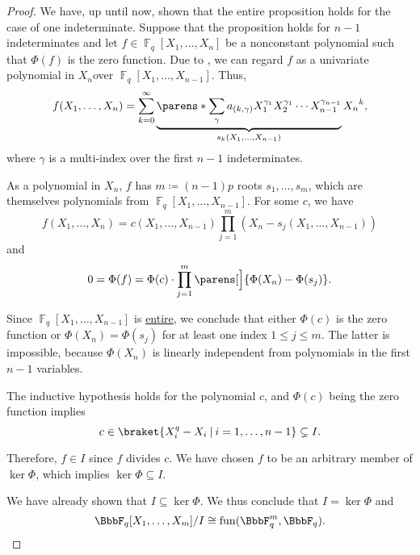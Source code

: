 \begin{proof}
  We have, up until now, shown that the entire proposition holds for the case of one indeterminate. Suppose that the proposition holds for \( n - 1 \) indeterminates and let \( f \in \BbbF_q[X_1, \ldots, X_n] \) be a nonconstant polynomial such that \( \Phi(f) \) is the zero function. Due to , we can regard \( f \) as a univariate polynomial in \( X_n \)over \( \BbbF_q[X_1, \ldots, X_{n-1}] \). Thus,
  \begin{equation*}
    f(X_1, \ldots, X_n) = \sum_{k =0}^\infty \underbrace{\parens*{ \sum_\gamma a_{(k,\gamma)} X_1^{\gamma_1} X_2^{\gamma_1} \cdots X_{n-1}^{\gamma_{n-1}} }}_{s_k(X_1, \ldots, X_{n-1})} {X_n}^k,
  \end{equation*}
  where \( \gamma \) is a multi-index over the first \( n - 1 \) indeterminates.

  As a polynomial in \( X_n \), \( f \) has \( m \coloneqq (n-1)p \) roots \( s_1, \ldots, s_m \), which are themselves polynomials from \( \BbbF_q[X_1, \ldots, X_{n-1}] \). For some \( c \), we have
  \begin{equation*}
    f(X_1, \ldots, X_n) = c(X_1, \ldots, X_{n-1}) \prod_{j=1}^m (X_n - s_j(X_1, \ldots, X_{n-1}))
  \end{equation*}
  and
  \begin{equation*}
    0 = \Phi(f) = \Phi(c) \cdot \prod_{j=1}^m \parens[\Big]{ \Phi(X_n) - \Phi(s_j) }.
  \end{equation*}

  Since \( \BbbF_q[X_1, \ldots, X_{n-1}] \) is \hyperref[def:entire_semiring]{entire}, we conclude that either \( \Phi(c) \) is the zero function or \( \Phi(X_n) = \Phi(s_j) \) for at least one index \( 1 \leq j \leq m \). The latter is impossible, because \( \Phi(X_n) \) is linearly independent from polynomials in the first \( n - 1 \) variables.

  The inductive hypothesis holds for the polynomial \( c \), and \( \Phi(c) \) being the zero function implies
  \begin{equation*}
    c \in \braket{ X_i^q - X_i \given i = 1, \ldots, n - 1 } \subsetneq I.
  \end{equation*}

  Therefore, \( f \in I \) since \( f \) divides \( c \). We have chosen \( f \) to be an arbitrary member of \( \ker \Phi \), which implies \( \ker \Phi \subseteq I \).

  We have already shown that \( I \subseteq \ker \Phi \). We thus conclude that \( I = \ker \Phi \) and
  \begin{equation*}
    \BbbF_q[X_1, \ldots, X_m] / I \cong \fun(\BbbF_q^m, \BbbF_q).
  \end{equation*}
\end{proof}

